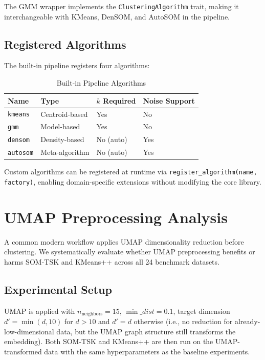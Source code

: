 \documentclass[journal]{IEEEtran}
\begin{document}
The GMM wrapper implements the \texttt{ClusteringAlgorithm} trait, making it interchangeable with KMeans, DenSOM, and AutoSOM in the pipeline.

\subsection{Registered Algorithms}

The built-in pipeline registers four algorithms:

\begin{table}[!t]
\caption{Built-in Pipeline Algorithms}
\label{tab:algorithms}
\centering
\renewcommand{\arraystretch}{1.1}
\small
\begin{tabular}{llll}
\toprule
Name & Type & $k$ Required & Noise Support \\
\midrule
\texttt{kmeans} & Centroid-based & Yes & No \\
\texttt{gmm} & Model-based & Yes & No \\
\texttt{densom} & Density-based & No (auto) & Yes \\
\texttt{autosom} & Meta-algorithm & No (auto) & Yes \\
\bottomrule
\end{tabular}
\end{table}

Custom algorithms can be registered at runtime via \texttt{register\_algorithm(name, factory)}, enabling domain-specific extensions without modifying the core library.


\section{UMAP Preprocessing Analysis}
\label{sec:umap}

A common modern workflow applies UMAP dimensionality reduction before clustering. We systematically evaluate whether UMAP preprocessing benefits or harms SOM-TSK and KMeans++ across all 24 benchmark datasets.

\subsection{Experimental Setup}

UMAP is applied with $n_{\text{neighbors}} = 15$, $\min\_dist = 0.1$, target dimension $d' = \min(d, 10)$ for $d > 10$ and $d' = d$ otherwise (i.e., no reduction for already-low-dimensional data, but the UMAP graph structure still transforms the embedding). Both SOM-TSK and KMeans++ are then run on the UMAP-transformed data with the same hyperparameters as the baseline experiments.
\end{document}
